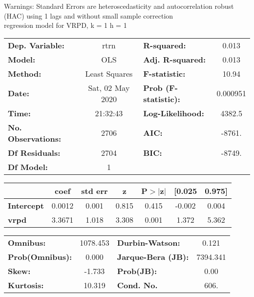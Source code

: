 Warnings: \newline
 [1] Standard Errors are heteroscedasticity and autocorrelation robust (HAC) using 1 lags and without small sample correction\\ 

regression model for VRPD, k = 1 h = 1\begin{center}
\begin{tabular}{lclc}
\toprule
\textbf{Dep. Variable:}    &       rtrn       & \textbf{  R-squared:         } &     0.013   \\
\textbf{Model:}            &       OLS        & \textbf{  Adj. R-squared:    } &     0.013   \\
\textbf{Method:}           &  Least Squares   & \textbf{  F-statistic:       } &     10.94   \\
\textbf{Date:}             & Sat, 02 May 2020 & \textbf{  Prob (F-statistic):} &  0.000951   \\
\textbf{Time:}             &     21:32:43     & \textbf{  Log-Likelihood:    } &    4382.5   \\
\textbf{No. Observations:} &        2706      & \textbf{  AIC:               } &    -8761.   \\
\textbf{Df Residuals:}     &        2704      & \textbf{  BIC:               } &    -8749.   \\
\textbf{Df Model:}         &           1      & \textbf{                     } &             \\
\bottomrule
\end{tabular}
\begin{tabular}{lcccccc}
                   & \textbf{coef} & \textbf{std err} & \textbf{z} & \textbf{P$> |$z$|$} & \textbf{[0.025} & \textbf{0.975]}  \\
\midrule
\textbf{Intercept} &       0.0012  &        0.001     &     0.815  &         0.415        &       -0.002    &        0.004     \\
\textbf{vrpd}      &       3.3671  &        1.018     &     3.308  &         0.001        &        1.372    &        5.362     \\
\bottomrule
\end{tabular}
\begin{tabular}{lclc}
\textbf{Omnibus:}       & 1078.453 & \textbf{  Durbin-Watson:     } &    0.121  \\
\textbf{Prob(Omnibus):} &   0.000  & \textbf{  Jarque-Bera (JB):  } & 7394.341  \\
\textbf{Skew:}          &  -1.733  & \textbf{  Prob(JB):          } &     0.00  \\
\textbf{Kurtosis:}      &  10.319  & \textbf{  Cond. No.          } &     606.  \\
\bottomrule
\end{tabular}
\end{center}

